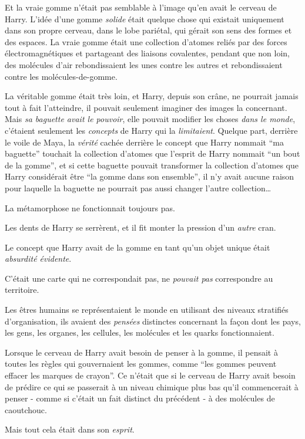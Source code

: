 Et la vraie gomme n'était pas semblable à l'image qu'en avait le cerveau de Harry. L'idée d'une gomme \emph{solide} était quelque chose qui existait uniquement dans son propre cerveau, dans le lobe pariétal, qui gérait son sens des formes et des espaces. La vraie gomme était une collection d'atomes reliés par des forces électromagnétiques et partageant des liaisons covalentes, pendant que non loin, des molécules d'air rebondissaient les unes contre les autres et rebondissaient contre les molécules-de-gomme.

La véritable gomme était très loin, et Harry, depuis son crâne, ne pourrait jamais tout à fait l'atteindre, il pouvait seulement imaginer des images la concernant. Mais \emph{sa baguette avait le pouvoir}, elle pouvait modifier les choses \emph{dans le monde}, c'étaient seulement les \emph{concepts} de Harry qui la \emph{limitaient}. Quelque part, derrière le voile de Maya, la \emph{vérité} cachée derrière le concept que Harry nommait “ma baguette” touchait la collection d'atomes que l'esprit de Harry nommait “un bout de la gomme”, et si cette baguette pouvait transformer la collection d'atomes que Harry considérait être “la gomme dans son ensemble”, il n'y avait aucune raison pour laquelle la baguette ne pourrait pas aussi changer l'autre collection…

La métamorphose ne fonctionnait toujours pas.

Les dents de Harry se serrèrent, et il fit monter la pression d'un \emph{autre} cran.

Le concept que Harry avait de la gomme en tant qu'un objet unique était \emph{absurdité évidente}.

C'était une carte qui ne correspondait pas, ne \emph{pouvait pas} correspondre au territoire.

Les êtres humains se représentaient le monde en utilisant des niveaux stratifiés d'organisation, ils avaient des \emph{pensées} distinctes concernant la façon dont les pays, les gens, les organes, les cellules, les molécules et les quarks fonctionnaient.

Lorsque le cerveau de Harry avait besoin de penser à la gomme, il pensait à toutes les règles qui gouvernaient les gommes, comme “les gommes peuvent effacer les marques de crayon”. Ce n'était que si le cerveau de Harry avait besoin de prédire ce qui se passerait à un niveau chimique plus bas qu'il commencerait à penser - comme si c'était un fait distinct du précédent - à des molécules de caoutchouc.

Mais tout cela était dans son \emph{esprit}.

